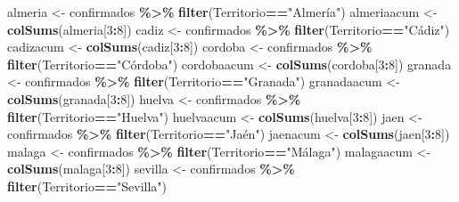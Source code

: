 \documentclass[
]{book}
\newenvironment{Shaded}{\begin{snugshade}}{\end{snugshade}}
\newcommand{\DecValTok}[1]{\textcolor[rgb]{0.00,0.00,0.81}{#1}}
\newcommand{\KeywordTok}[1]{\textcolor[rgb]{0.13,0.29,0.53}{\textbf{#1}}}
\newcommand{\NormalTok}[1]{#1}
\newcommand{\OperatorTok}[1]{\textcolor[rgb]{0.81,0.36,0.00}{\textbf{#1}}}
\newcommand{\StringTok}[1]{\textcolor[rgb]{0.31,0.60,0.02}{#1}}
\begin{document}
\begin{Shaded}
\begin{Highlighting}[]
\NormalTok{almeria \textless{}{-}}\StringTok{ }\NormalTok{confirmados }\OperatorTok{\%\textgreater{}\%}\StringTok{ }\KeywordTok{filter}\NormalTok{(Territorio}\OperatorTok{==}\StringTok{"Almería"}\NormalTok{)}
\NormalTok{almeriaacum \textless{}{-}}\StringTok{ }\KeywordTok{colSums}\NormalTok{(almeria[}\DecValTok{3}\OperatorTok{:}\DecValTok{8}\NormalTok{])}
\NormalTok{cadiz \textless{}{-}}\StringTok{ }\NormalTok{confirmados }\OperatorTok{\%\textgreater{}\%}\StringTok{ }\KeywordTok{filter}\NormalTok{(Territorio}\OperatorTok{==}\StringTok{"Cádiz"}\NormalTok{)}
\NormalTok{cadizacum \textless{}{-}}\StringTok{ }\KeywordTok{colSums}\NormalTok{(cadiz[}\DecValTok{3}\OperatorTok{:}\DecValTok{8}\NormalTok{])}
\NormalTok{cordoba \textless{}{-}}\StringTok{ }\NormalTok{confirmados }\OperatorTok{\%\textgreater{}\%}\StringTok{ }\KeywordTok{filter}\NormalTok{(Territorio}\OperatorTok{==}\StringTok{"Córdoba"}\NormalTok{)}
\NormalTok{cordobaacum \textless{}{-}}\StringTok{ }\KeywordTok{colSums}\NormalTok{(cordoba[}\DecValTok{3}\OperatorTok{:}\DecValTok{8}\NormalTok{])}
\NormalTok{granada \textless{}{-}}\StringTok{ }\NormalTok{confirmados }\OperatorTok{\%\textgreater{}\%}\StringTok{ }\KeywordTok{filter}\NormalTok{(Territorio}\OperatorTok{==}\StringTok{"Granada"}\NormalTok{)}
\NormalTok{granadaacum \textless{}{-}}\StringTok{ }\KeywordTok{colSums}\NormalTok{(granada[}\DecValTok{3}\OperatorTok{:}\DecValTok{8}\NormalTok{])}
\NormalTok{huelva \textless{}{-}}\StringTok{ }\NormalTok{confirmados }\OperatorTok{\%\textgreater{}\%}\StringTok{ }\KeywordTok{filter}\NormalTok{(Territorio}\OperatorTok{==}\StringTok{"Huelva"}\NormalTok{)}
\NormalTok{huelvaacum \textless{}{-}}\StringTok{ }\KeywordTok{colSums}\NormalTok{(huelva[}\DecValTok{3}\OperatorTok{:}\DecValTok{8}\NormalTok{])}
\NormalTok{jaen \textless{}{-}}\StringTok{ }\NormalTok{confirmados }\OperatorTok{\%\textgreater{}\%}\StringTok{ }\KeywordTok{filter}\NormalTok{(Territorio}\OperatorTok{==}\StringTok{"Jaén"}\NormalTok{)}
\NormalTok{jaenacum \textless{}{-}}\StringTok{ }\KeywordTok{colSums}\NormalTok{(jaen[}\DecValTok{3}\OperatorTok{:}\DecValTok{8}\NormalTok{])}
\NormalTok{malaga \textless{}{-}}\StringTok{ }\NormalTok{confirmados }\OperatorTok{\%\textgreater{}\%}\StringTok{ }\KeywordTok{filter}\NormalTok{(Territorio}\OperatorTok{==}\StringTok{"Málaga"}\NormalTok{)}
\NormalTok{malagaacum \textless{}{-}}\StringTok{ }\KeywordTok{colSums}\NormalTok{(malaga[}\DecValTok{3}\OperatorTok{:}\DecValTok{8}\NormalTok{])}
\NormalTok{sevilla \textless{}{-}}\StringTok{ }\NormalTok{confirmados }\OperatorTok{\%\textgreater{}\%}\StringTok{ }\KeywordTok{filter}\NormalTok{(Territorio}\OperatorTok{==}\StringTok{"Sevilla"}\NormalTok{)}

\end{Highlighting}
\end{Shaded}
\end{document}
